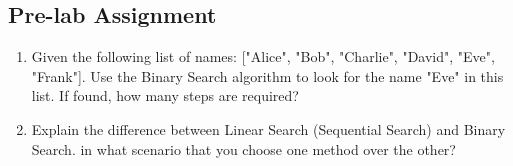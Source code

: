 \subsection{Pre-lab Assignment}
\begin{enumerate}
    \item Given the following list of names: ["Alice", "Bob", "Charlie", "David", "Eve", "Frank"].
          Use the Binary Search algorithm to look for the name "Eve" in this list. If found, how many steps are required?
    \item Explain the difference between Linear Search (Sequential Search) and Binary Search.
          in what scenario that you choose one method over the other?
\end{enumerate}
